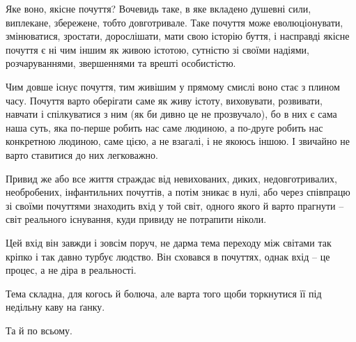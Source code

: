 Яке воно, якісне почуття? Вочевидь таке, в яке вкладено душевні сили,
виплекане, збережене, тобто довготривале. Таке почуття може еволюціонувати,
змінюватися, зростати, дорослішати, мати свою історію буття, і насправді якісне
почуття є ні чим іншим як живою істотою, сутністю зі своїми надіями,
розчаруваннями, звершеннями та врешті особистістю. 

Чим довше існує почуття, тим живішим у прямому смислі воно стає з плином часу.
Почуття варто оберігати саме як живу істоту, виховувати, розвивати, навчати і
спілкуватися з ним (як би дивно це не прозвучало), бо в них є сама наша суть,
яка по-перше робить нас саме людиною, а по-друге робить нас конкретною людиною,
саме цією, а не взагалі, і не якоюсь іншою. І звичайно не варто ставитися до
них легковажно.

Привид же або все життя страждає від невихованих, диких, недовготривалих,
необробених, інфантильних почуттів, а потім зникає в нулі, або через співпрацю
зі своїми почуттями знаходить вхід у той світ, одного якого й варто прагнути –
світ реального існування, куди привиду не потрапити ніколи.

Цей вхід він завжди і зовсім поруч, не дарма тема переходу між світами так
кріпко і так давно турбує людство. Він сховався в почуттях, однак вхід – це
процес, а не діра в реальності.

Тема складна, для когось й болюча, але варта того щоби торкнутися її під
недільну каву на ґанку.

Та й по всьому.

